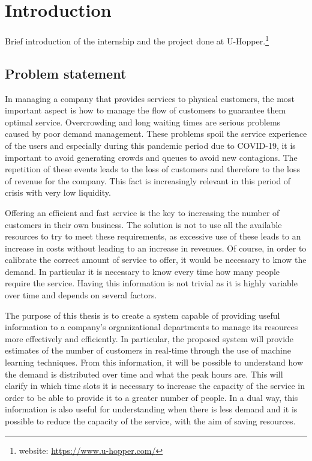 \chapter{Introduction}
\label{cha:intro}
\vspace{0.4 cm} 

Brief introduction of the internship and the project done at U-Hopper.\footnote{ website: \url{https://www.u-hopper.com/} }


\section{Problem statement}
\label{sec:problem}
\vspace{0.2 cm} 

In managing a company that provides services to physical customers, the most important aspect is how to manage the flow of customers to guarantee them optimal service. Overcrowding and long waiting times are serious problems caused by poor demand management. These problems spoil the service experience of the users and especially during this pandemic period due to COVID-19, it is important to avoid generating crowds and queues to avoid new contagions. The repetition of these events leads to the loss of customers and therefore to the loss of revenue for the company. This fact is increasingly relevant in this period of crisis with very low liquidity.

Offering an efficient and fast service is the key to increasing the number of customers in their own business. The solution is not to use all the available resources to try to meet these requirements, as excessive use of these leads to an increase in costs without leading to an increase in revenues.
Of course, in order to calibrate the correct amount of service to offer, it would be necessary to know the demand. In particular it is necessary to know every time how many people require the service. Having this information is not trivial as it is highly variable over time and depends on several factors.

The purpose of this thesis is to create a system capable of providing useful information to a company's organizational departments to manage its resources more effectively and efficiently. In particular, the proposed system will provide estimates of the number of customers in real-time through the use of machine learning techniques.
From this information, it will be possible to understand how the demand is distributed over time and what the peak hours are. This will clarify in which time slots it is necessary to increase the capacity of the service in order to be able to provide it to a greater number of people. In a dual way, this information is also useful for understanding when there is less demand and it is possible to reduce the capacity of the service, with the aim of saving resources.

